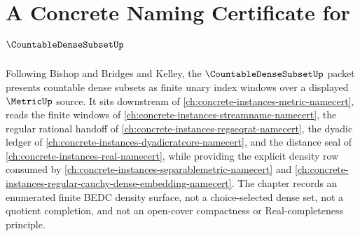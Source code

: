 \chapter{A Concrete Naming Certificate for $\CountableDenseSubsetUp$}
\label{ch:concrete-instances-countable-dense-subset-namecert}

Following Bishop and Bridges and Kelley, the $\CountableDenseSubsetUp$ packet presents countable dense subsets as finite unary index windows over a displayed $\MetricUp$ source. It sits downstream of \autoref{ch:concrete-instances-metric-namecert}, reads the finite windows of \autoref{ch:concrete-instances-streamname-namecert}, the regular rational handoff of \autoref{ch:concrete-instances-regseqrat-namecert}, the dyadic ledger of \autoref{ch:concrete-instances-dyadicratcore-namecert}, and the distance seal of \autoref{ch:concrete-instances-real-namecert}, while providing the explicit density row consumed by \autoref{ch:concrete-instances-separablemetric-namecert} and \autoref{ch:concrete-instances-regular-cauchy-dense-embedding-namecert}. The chapter records an enumerated finite BEDC density surface, not a choice-selected dense set, not a quotient completion, and not an open-cover compactness or Real-completeness principle.

